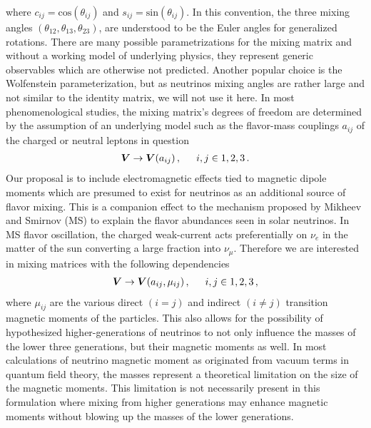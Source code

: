 where $c_{ij} = \mathrm{cos}(\theta_{ij})$ and $s_{ij} = \mathrm{sin}(\theta_{ij})$. In this convention, the three mixing angles $(\theta_{12}, \theta_{13}, \theta_{23})$, are understood to be the Euler angles for generalized rotations. There are many possible parametrizations for the mixing matrix and without a working model of underlying physics, they represent generic observables which are otherwise not predicted. Another popular choice is the Wolfenstein parameterization, but as neutrinos mixing angles are rather large and not similar to the identity matrix, we will not use it here. In most phenomenological studies, the mixing matrix's degrees of freedom are determined by the assumption of an underlying model such as the flavor-mass couplings $a_{ij}$ of the charged or neutral leptons in question
\begin{alignat}{1}
	\label{pmns:eq:04a} \bb{V}\rightarrow\bb{V}(a_{ij})\,,\indent i,j\in1,2,3\,.
\end{alignat}
Our proposal is to include electromagnetic effects tied to magnetic dipole moments which are presumed to exist for neutrinos as an additional source of flavor mixing. This is a companion effect to the mechanism proposed by Mikheev and Smirnov (MS) to explain the flavor abundances seen in solar neutrinos. In MS flavor oscillation, the charged weak-current acts preferentially on $\nu_{e}$ in the matter of the sun converting a large fraction into $\nu_{\mu}$. Therefore we are interested in mixing matrices with the following dependencies 
\begin{alignat}{1}
	\label{pmns:eq:04b} \bb{V}\rightarrow\bb{V}(a_{ij},\mu_{ij})\,,\indent i,j\in1,2,3\,,
\end{alignat}
where $\mu_{ij}$ are the various direct $(i=j)$ and indirect $(i\neq j)$ transition magnetic moments of the particles. This also allows for the possibility of hypothesized higher-generations of neutrinos to not only influence the masses of the lower three generations, but their magnetic moments as well. In most calculations of neutrino magnetic moment as originated from vacuum terms in quantum field theory, the masses represent a theoretical limitation on the size of the magnetic moments. This limitation is not necessarily present in this formulation where mixing from higher generations may enhance magnetic moments without blowing up the masses of the lower generations.

